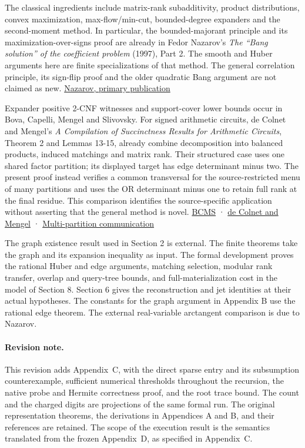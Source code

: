 \documentclass[
  11pt,
]{article}
\begin{document}
The classical ingredients include matrix-rank subadditivity, product
distributions, convex maximization, max-flow/min-cut, bounded-degree
expanders and the second-moment method. In particular, the
bounded-majorant principle and its maximization-over-signs proof are
already in Fedor Nazarov's \emph{The ``Bang solution'' of the
coefficient problem} (1997), Part 2. The smooth and Huber arguments here
are finite specializations of that method. The general correlation
principle, its sign-flip proof and the older quadratic Bang argument are
not claimed as new. \href{https://www.mathnet.ru/eng/aa774}{Nazarov,
primary publication}

Expander positive 2-CNF witnesses and support-cover lower bounds occur
in Bova, Capelli, Mengel and Slivovsky. For signed arithmetic circuits,
de Colnet and Mengel's \emph{A Compilation of Succinctness Results for
Arithmetic Circuits}, Theorem 2 and Lemmas 13-15, already combine
decomposition into balanced products, induced matchings and matrix rank.
Their structured case uses one shared factor partition; its displayed
target has edge determinant minus two. The present proof instead
verifies a common transversal for the source-restricted menu of many
partitions and uses the OR determinant minus one to retain full rank at
the final residue. This comparison identifies the source-specific
application without asserting that the general method is novel.
\href{https://arxiv.org/abs/1411.1995}{BCMS} ·
\href{https://arxiv.org/abs/2110.13014}{de Colnet and Mengel} ·
\href{https://ijcai.org/proceedings/2016/147}{Multi-partition
communication}

The graph existence result used in Section 2 is external. The finite
theorems take the graph and its expansion inequality as input. The
formal development proves the rational Huber and edge arguments,
matching selection, modular rank transfer, overlap and query-tree
bounds, and full-materialization cost in the model of Section 8.
Section 6 gives the reconstruction and jet identities at their actual
hypotheses. The constants for the graph argument in Appendix B use the
rational edge theorem. The external real-variable arctangent comparison
is due to Nazarov.

\paragraph{Revision note.}
This revision adds Appendix~C, with the direct sparse entry and its
subsumption counterexample, sufficient numerical thresholds throughout
the recursion, the native probe and Hermite correctness proof, and the
root trace bound. The count and the charged digits are projections of
the same formal run. The original representation theorems, the
derivations in Appendices A and B, and their references are retained.
The scope of the execution result is the semantics translated from
the frozen Appendix~D, as specified in Appendix~C.
\end{document}
